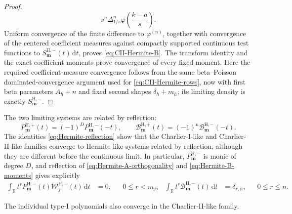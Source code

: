 \documentclass[10pt]{amsart}
\newcommand{\dd}{\,\mathrm d}
\newcommand{\mm}{\boldsymbol m}
\theoremstyle{plain}
\theoremstyle{definition}
\theoremstyle{remark}
\begin{document}
\begin{proof}
\[ s^n\Delta_{1/s}^n\varphi\!\left(\frac{k-a}{s}\right).
\]
Uniform convergence of the finite difference to \(\varphi^{(n)}\),
together with convergence of the centered coefficient measures against
compactly supported continuous test functions to
\(S_{\mm}^{\mathrm H,-}(t)\dd t\), proves
\eqref{eq:CII-Hermite-B}. The transform identity and the exact coefficient
moments prove convergence of every fixed moment.
Here the required coefficient-measure convergence follows from the same
beta--Poisson dominated-convergence argument used for
\eqref{eq:CII-Hermite-rows}, now with first beta parameters \(A_h+n\)
and fixed second shapes \(\delta_h+m_h\); its limiting density is exactly
\(S_{\mm}^{\mathrm H,-}\).
\end{proof}

The two limiting systems are related by reflection:
\begin{equation}
 P_{\mm}^{\mathrm H,+}(t)=(-1)^D
 P_{\mm}^{\mathrm H,-}(-t),\qquad
 \mathcal B_{\mm}^{\mathrm H,+}(t)=(-1)^n
 \mathcal B_{\mm}^{\mathrm H,-}(-t).
 \label{eq:Hermite-reflection}
\end{equation}
The identities \eqref{eq:Hermite-reflection} show that the Charlier-I-like
and Charlier-II-like families converge to Hermite-like systems related by
reflection, although they are different before the continuous limit.
In particular, \(P_{\mm}^{\mathrm H,-}\) is monic of degree \(D\), and
reflection of \eqref{eq:Hermite-A-orthogonality} and
\eqref{eq:Hermite-B-moments} gives explicitly
\begin{align*}
 \int_{\mathbb R}t^rP_{\mm}^{\mathrm H,-}(t)
 \mathcal W_j^{\mathrm H,-}(t)\dd t
 &=0,
 &&0\le r<m_j,
&
 \int_{\mathbb R}t^r\mathcal B_{\mm}^{\mathrm H,-}(t)\dd t
 &=\delta_{r,n},
 &&0\le r\le n.
\end{align*}

The individual type-I polynomials also converge in the Charlier-II-like
family.
\end{document}
